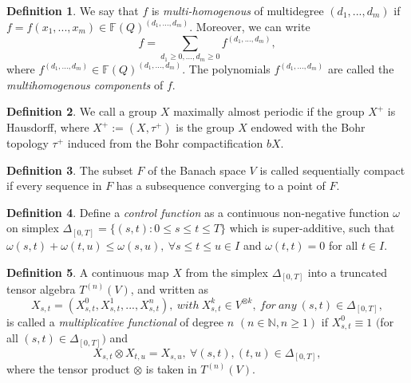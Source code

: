 \documentclass[12pt,a4paper]{report}
\theoremstyle{definition}
\newtheorem{definition}{Definition}
\begin{document}
\begin{appendix}
\begin{definition}\parencite{cioletti2017polynomial}
	 We say that $f$ is\textit{ multi-homogenous} of multidegree $(d_1, . . . , d_m)$ if $f=f(x_1, . . . , x_m) \in \mathbb{F}(Q)^{(d_1,...,d_m)}$. Moreover, we can write 
	 \begin{equation}
	 	f=\sum_{d_1\geq 0,..., d_m\geq 0} f^{(d_1,...,d_m)},
	 \end{equation}
 where $f^{(d_1,...,d_m)} \in \mathbb{F}(Q)^{(d_1,...,d_m)}$. The polynomials $f^{(d_1,...,d_m)}$ are called the  \textit{multihomogenous components} of $f$.
\end{definition}
\begin{definition}\parencite{neumann1934almost}
	We call a group $X$ maximally almost periodic if the group $X^+$ is Hausdorff, where $X^+ := (X, \tau^+)$ is the group $X$ endowed with	the Bohr topology $\tau ^+$ induced from the Bohr compactification $bX$.
\end{definition}

\begin{definition}\parencite{zaanen2012introduction}
	The subset $F$ of the Banach space $V$ is called sequentially compact if
	every sequence in $F$ has a subsequence converging to a point of $F$.
\end{definition}
 


\begin{definition}\parencite{lyons2002system}
	Define a \textit{control function} as a continuous non-negative function $\omega$ on simplex $\Delta_{[0,T]}=\{(s,t): 0\leq s\leq t\leq T \}$ which is super-additive, such that $\omega(s, t) + \omega(t, u) \leq \omega(s, u), \: \forall s \leq t \leq u \in I$ and $\omega(t, t)=0$ for all $t \in I$.
\end{definition}


\begin{definition}\parencite{lyons2002system}
	A continuous map $X$ from the simplex $\Delta_{[0,T]}$ into a truncated tensor algebra $T^{(n)}(V)$, and written as	
	\begin{equation}
			X_{s,t}=(X_{s,t}^0, X_{s,t}^1,..., X_{s,t}^n), \: with \: X_{s,t}^k\in V^{\otimes k}, \: for\: any \:(s,t)\in \Delta_{[0,T]},
			\end{equation}
	is called a \textit{multiplicative functional} of degree $n$ $(n\in \mathbb{N},n\geq1)$ if $X_{s,t}^0\equiv 1$ $($for all $(s,t) \in \Delta_{[0,T]})$ and
	\begin{equation}
		X_{s,t}\otimes X_{t,u}=X_{s,u},\: \forall (s,t),(t,u) \in \Delta_{[0,T]}, 
	\end{equation}
where the tensor product $\otimes$ is taken in $T^{(n)}(V)$.
\end{definition}


\end{appendix}
\end{document}

